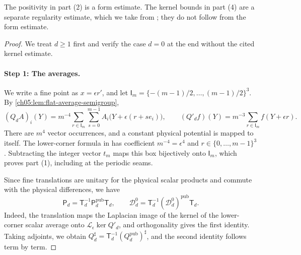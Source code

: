 The positivity in part (2) is a form estimate. The kernel bounds in part (4) are a separate regularity estimate, which we take from \cite{Balaban1984II}; they do not follow from the form estimate.

\begin{proof}
We treat $d\ge1$ first and verify the case $d=0$ at the end without the cited kernel estimate.

\paragraph{Step 1: The averages.}
We write a fine point as $x=\epsilon r'$, and let $\mathsf I_m=\{-(m-1)/2,\ldots,(m-1)/2\}^3$. By \cref{ch05:lem:flat-average-semigroup},
\begin{equation}\label{ch06:eq:centered-physical-average}
 (Q_dA)_i(Y)=m^{-4}\sum_{r\in\mathsf I_m}\sum_{s=0}^{m-1}A_i\bigl(Y+\epsilon(r+se_i)\bigr),\qquad(Q'_df)(Y)=m^{-3}\sum_{r\in\mathsf I_m}f(Y+\epsilon r).
\end{equation}
There are $m^4$ vector occurrences, and a constant physical potential is mapped to itself. The lower-corner formula in \cite[(1.11), p.~19; (1.18), p.~20]{Balaban1984I} has coefficient $m^{-4}=\epsilon^4$ and $r\in\{0,\ldots,m-1\}^3$. Subtracting the integer vector $t_m$ maps this box bijectively onto $\mathsf I_m$, which proves part (1), including at the periodic seams.

Since fine translations are unitary for the physical scalar products and commute with the physical differences, we have
\begin{equation}\label{ch06:eq:translated-projector}
 \mathsf P_d=\mathsf T_d^{-1}\mathsf P_d^{\mathrm{pub}}\mathsf T_d,\qquad\mathscr D_d^0=\mathsf T_d^{-1}(\mathscr D_d^0)^{\mathrm{pub}}\mathsf T_d.
\end{equation}
Indeed, the translation maps the Laplacian image of the kernel of the lower-corner scalar average onto $\mathscr L_\epsilon\ker Q'_d$, and orthogonality gives the first identity. Taking adjoints, we obtain $Q_d^\sharp=\mathsf T_d^{-1}(Q_d^{\mathrm{pub}})^\sharp$, and the second identity follows term by term.


\end{proof}
